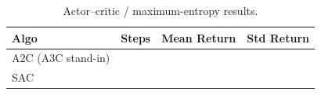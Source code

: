 \begin{table}[h]
\centering
\caption{Actor--critic / maximum-entropy results.}
\label{tab:acresults}
\begin{tabular}{lccc}
\toprule
Algo & Steps & Mean Return & Std Return \\
\midrule
A2C (A3C stand-in) & & & \\
SAC & & & \\
\bottomrule
\end{tabular}
\end{table}

